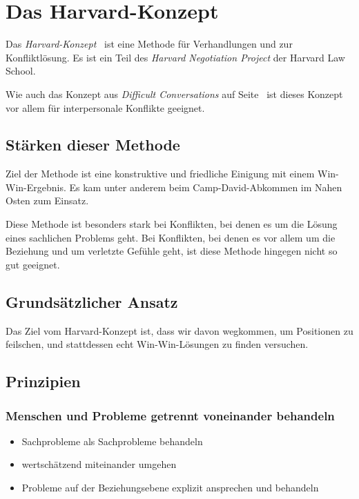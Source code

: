 \section{Das Harvard-Konzept}
\label{harvard-konzept}

Das \emph{Harvard-Konzept}~\cite{harvard-konzept} ist eine Methode für Verhandlungen und zur Konfliktlösung. Es ist ein Teil des \emph{Harvard Negotiation Project} der Harvard Law School.

Wie auch das Konzept aus \emph{Difficult Conversations} auf Seite~\pageref{difficult-conversations} ist dieses Konzept vor allem für interpersonale Konflikte geeignet.

\subsection{Stärken dieser Methode}

Ziel der Methode ist eine konstruktive und friedliche Einigung mit einem Win-Win-Ergebnis. Es kam unter anderem beim Camp-David-Abkommen im Nahen Osten zum Einsatz.

Diese Methode ist besonders stark bei Konflikten, bei denen es um die Lösung eines sachlichen Problems geht. Bei Konflikten, bei denen es vor allem um die Beziehung und um verletzte Gefühle geht, ist diese Methode hingegen nicht so gut geeignet.

\subsection{Grundsätzlicher Ansatz}

Das Ziel vom Harvard-Konzept ist, dass wir davon wegkommen, um Positionen zu feilschen, und stattdessen echt Win-Win-Lösungen zu finden versuchen.

\subsection{Prinzipien}

\subsubsection{Menschen und Probleme getrennt voneinander behandeln}

\begin{itemize}
    \item Sachprobleme als Sachprobleme behandeln
    \item wertschätzend miteinander umgehen
    \item Probleme auf der Beziehungsebene explizit ansprechen und behandeln
\end{itemize}

